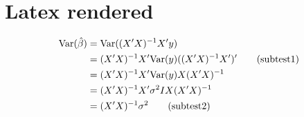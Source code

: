 \documentclass{article}
\begin{document}
\section*{Latex rendered}


\begin{align}
\mathrm{Var}(\hat{\beta}) & =\mathrm{Var}((X'X)^{-1}X'y)\\
 & =(X'X)^{-1}X'\mathrm{Var}(y)((X'X)^{-1}X')'  \tag{subtest1}\\
 & =(X'X)^{-1}X'\mathrm{Var}(y)X(X'X)^{-1}\notag\\
 & =(X'X)^{-1}X'\sigma^{2}IX(X'X)^{-1}\\
 & =(X'X)^{-1}\sigma^{2}\tag{subtest2}
 \end{align}
\end{document}
